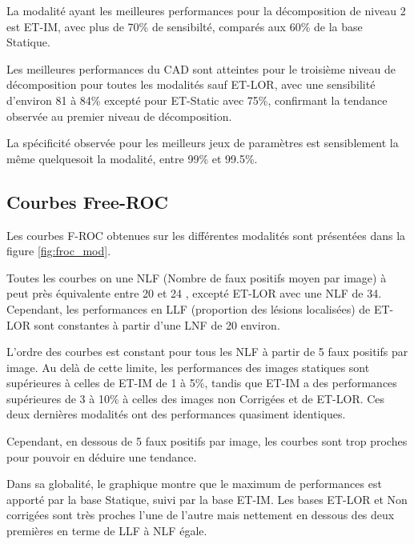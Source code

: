 La modalité ayant les meilleures performances pour la décomposition de niveau 2 est ET-IM, avec plus de 70\% de sensibilté, comparés aux 60\% de la base Statique. 

Les meilleures performances du CAD sont atteintes pour le troisième niveau de décomposition pour toutes les modalités sauf ET-LOR, avec une sensibilité d'environ 81 à 84\% excepté pour ET-Static avec 75\%, confirmant la tendance observée au premier niveau de décomposition.

La spécificité observée pour les meilleurs jeux de paramètres est sensiblement la même quelquesoit la modalité, entre 99\% et 99.5\%.

\subsection{Courbes Free-ROC}

Les courbes F-ROC obtenues sur les différentes modalités sont présentées dans la figure \ref{fig:froc_mod}. 

Toutes les courbes on une NLF (Nombre de faux positifs moyen par image) à peut près équivalente entre 20 et 24 , excepté ET-LOR avec une NLF de 34. Cependant, les performances en LLF (proportion des lésions localisées) de ET-LOR sont constantes à partir d'une LNF de 20 environ. 

L'ordre des courbes est constant pour tous les NLF à partir de 5 faux positifs par image. Au delà de cette limite, les performances des images statiques sont supérieures à celles de ET-IM de 1 à 5\%, tandis que ET-IM a des performances supérieures de 3 à 10\% à celles des images non Corrigées et de ET-LOR. Ces deux dernières modalités ont des performances quasiment identiques.

Cependant, en dessous de 5 faux positifs par image, les courbes sont trop proches pour pouvoir en déduire une tendance.


Dans sa globalité, le graphique montre que le maximum de performances est apporté par la base Statique, suivi par la base ET-IM. Les bases ET-LOR et Non corrigées sont très proches l'une de l'autre mais nettement en dessous des deux premières en terme de LLF à NLF égale.


